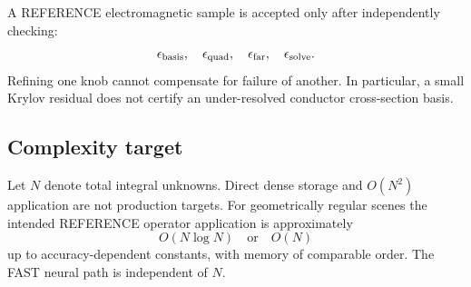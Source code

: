 A REFERENCE electromagnetic sample is accepted only after independently
checking:
\[
 \epsilon_{\rm basis},\quad
 \epsilon_{\rm quad},\quad
 \epsilon_{\rm far},\quad
 \epsilon_{\rm solve}.
\]
Refining one knob cannot compensate for failure of another. In particular, a
small Krylov residual does not certify an under-resolved conductor
cross-section basis.

\subsection{Complexity target}

Let $N$ denote total integral unknowns. Direct dense storage and
$O(N^2)$ application are not production targets. For geometrically regular
scenes the intended REFERENCE operator application is approximately
\[
  O(N\log N)\quad\text{or}\quad O(N)
\]
up to accuracy-dependent constants, with memory of comparable order. The FAST
neural path is independent of $N$.
